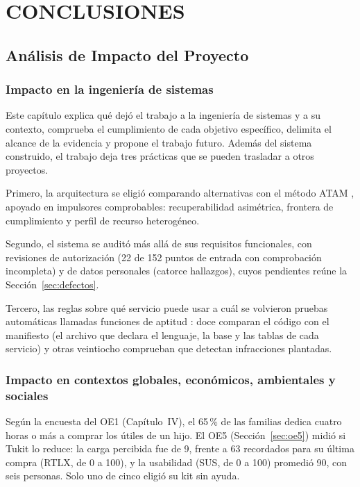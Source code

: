  \setcounter{subsection}{0}

\section{CONCLUSIONES}

\subsection{Análisis de Impacto del Proyecto}

\subsubsection{Impacto en la ingeniería de sistemas}

Este capítulo explica qué dejó el trabajo a la ingeniería de sistemas y a su contexto, comprueba el cumplimiento de cada objetivo específico, delimita el alcance de la evidencia y propone el trabajo futuro. Además del sistema construido, el trabajo deja tres prácticas que se pueden trasladar a otros proyectos.

Primero, la arquitectura se eligió comparando alternativas con el método ATAM \citep{bass_software_2021}, apoyado en impulsores comprobables: recuperabilidad asimétrica, frontera de cumplimiento y perfil de recurso heterogéneo.

Segundo, el sistema se auditó más allá de sus requisitos funcionales, con revisiones de autorización (22 de 152 puntos de entrada con comprobación incompleta) y de datos personales (catorce hallazgos), cuyos pendientes reúne la Sección~\ref{sec:defectos}.

Tercero, las reglas sobre qué servicio puede usar a cuál se volvieron pruebas automáticas llamadas funciones de aptitud \citep{ford_building_2017}: doce comparan el código con el manifiesto (el archivo que declara el lenguaje, la base y las tablas de cada servicio) y otras veintiocho comprueban que detectan infracciones plantadas.

\subsubsection{Impacto en contextos globales, económicos, ambientales y sociales}

Según la encuesta del OE1 (Capítulo~IV), el 65\,\% de las familias dedica cuatro horas o más a comprar los útiles de un hijo. El OE5 (Sección~\ref{sec:oe5}) midió si Tukit lo reduce: la carga percibida fue de 9, frente a 63 recordados para su última compra (RTLX, de 0 a 100), y la usabilidad (SUS, de 0 a 100) promedió 90, con seis personas. Solo uno de cinco eligió su kit sin ayuda.

